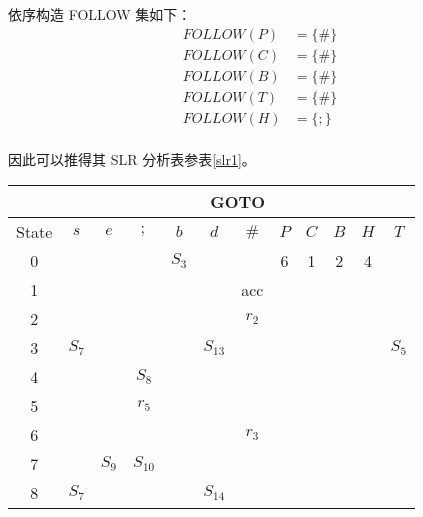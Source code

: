 \documentclass[UTF8]{ctexart}
\begin{document}
    依序构造 FOLLOW 集如下：
    \begin{align*}
        FOLLOW(P) &= \{\#\} \\
        FOLLOW(C) &= \{\#\} \\
        FOLLOW(B) &= \{\#\} \\
        FOLLOW(T) &= \{\#\} \\
        FOLLOW(H) &= \{;\} \\
    \end{align*}

    因此可以推得其 SLR 分析表参表\ref{slr1}。

    \begin{table}[htbp!]
        \centering
        \begin{tabular}{|c|c|c|c|c|c|c|c|c|c|c|c|}
            \hline
            & \multicolumn{11}{|c|}{GOTO}  \\
            \hline
            State &  $s$  &  $e$  &  $;$  &  $b$  &  $d$  &  $\#$ &  $P$  &  $C$  &  $B$  &  $H$  &  $T$  \\
            \hline
            0     &       &       &       & $S_3$ &       &       &   6   &  1    &   2   &   4   &       \\
            \hline
            1     &       &       &       &       &       &  acc  &       &       &       &       &       \\
            \hline
            2     &       &       &       &       &       & $r_2$ &       &       &       &       &       \\
            \hline
            3     & $S_7$ &       &       &       &$S_{13}$&      &       &       &       &       & $S_5$ \\
            \hline
            4     &       &       & $S_8$ &       &       &       &       &       &       &       &       \\
            \hline
            5     &       &       & $r_5$ &       &       &       &       &       &       &       &       \\
            \hline
            6     &       &       &       &       &       & $r_3$ &       &       &       &       &       \\
            \hline
            7     &       & $S_9$ &$S_{10}$&      &       &       &       &       &       &       &       \\
            \hline
            8     & $S_7$ &       &       &       &$S_{14}$&      &       &       &       &       &       \\
            \hline

\end{tabular}
\end{table}
\end{document}
